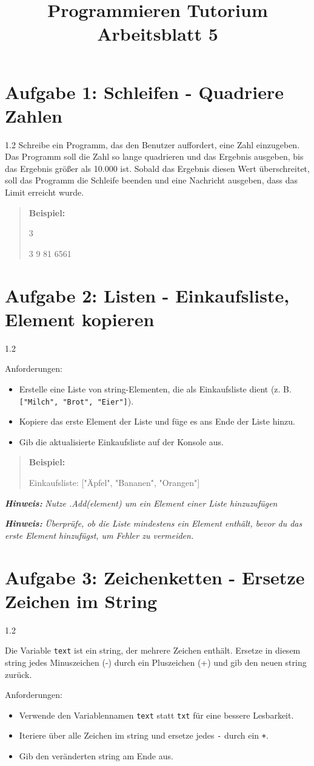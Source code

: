 \documentclass[12pt]{article}
\newcommand{\exercise}[3]{
    \section*{Aufgabe #1: #2}
    \vspace{-0.5em}
    \begin{spacing}{1.2}
     #3
    \end{spacing}
    \vspace{1em}
}
\newcommand{\hint}[1]{
    \vspace{0.5em}
    \textbf{\textit{Hinweis:}} \textit{#1}
    \vspace{0.5em}
}
\newcommand{\example}[2]{
    \vspace{0.2em}
    \begin{quote}
        \textbf{Beispiel:}
        \begin{description}[align=left]
            \item[Eingabe:] #1
            \item[Ausgabe:] #2
        \end{description}
    \end{quote}
    \vspace{0.5em}
}
\begin{document}
\title{Programmieren Tutorium \\ \large Arbeitsblatt 5}
\author{}
\date{}
\maketitle

\exercise{1}{Schleifen - Quadriere Zahlen}{Schreibe ein Programm, das den Benutzer auffordert, eine Zahl einzugeben. Das Programm soll die Zahl so lange quadrieren und das Ergebnis ausgeben, bis das Ergebnis größer als 10.000 ist. Sobald das Ergebnis diesen Wert überschreitet, soll das Programm die Schleife beenden und eine Nachricht ausgeben, dass das Limit erreicht wurde.}

\example{3}{3 9 81 6561}

\exercise{2}{Listen - Einkaufsliste, Element kopieren}{
Anforderungen:
\begin{itemize}
    \item Erstelle eine Liste von string-Elementen, die als Einkaufsliste dient (z. B. \texttt{["Milch", "Brot", "Eier"]}).
    \item Kopiere das erste Element der Liste und füge es ans Ende der Liste hinzu.
    \item Gib die aktualisierte Einkaufsliste auf der Konsole aus.
\end{itemize}
}

\example{Einkaufsliste: ["Äpfel", "Bananen", "Orangen"]}{["Äpfel", "Bananen", "Orangen", "Äpfel"]}

\hint{Nutze .Add(element) um ein Element einer Liste hinzuzufügen}

\hint{Überprüfe, ob die Liste mindestens ein Element enthält, bevor du das erste Element hinzufügst, um Fehler zu vermeiden.}



\exercise{3}{Zeichenketten - Ersetze Zeichen im String}{
Die Variable \texttt{text} ist ein string, der mehrere Zeichen enthält. Ersetze in diesem string jedes Minuszeichen (-) durch ein Pluszeichen (+) und gib den neuen string zurück.

Anforderungen:
\begin{itemize}
    \item Verwende den Variablennamen \texttt{text} statt \texttt{txt} für eine bessere Lesbarkeit.
    \item Iteriere über alle Zeichen im string und ersetze jedes \texttt{-} durch ein \texttt{+}.
    \item Gib den veränderten string am Ende aus.
\end{itemize}
}
\end{document}
